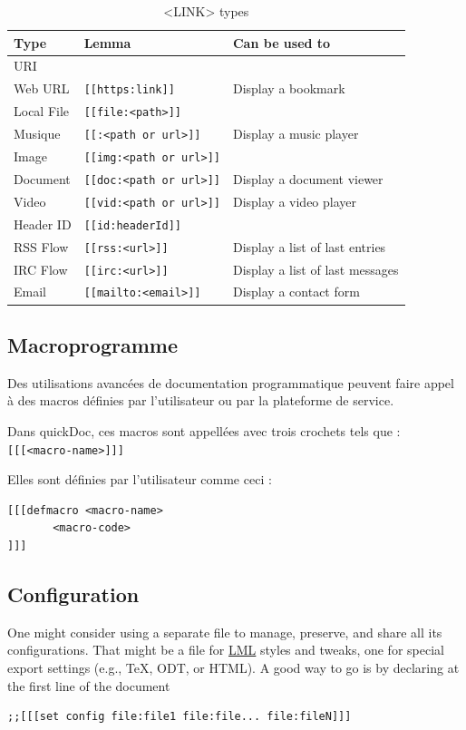 \documentclass[a4paper,12pt]{article}
\begin{document}
\begin{table}[htbp]
\caption{<LINK> types}
\centering
\begin{tabular}{lll}
\hline
Type & Lemma & Can be used to\\
\hline
URI &  & \\
Web URL & \texttt{[[https:link]]} & Display a bookmark\\
Local File & \texttt{[[file:<path>]]} & \\
Musique & \texttt{[[:<path or url>]]} & Display a music player\\
Image & \texttt{[[img:<path or url>]]} & \\
Document & \texttt{[[doc:<path or url>]]} & Display a document viewer\\
Video & \texttt{[[vid:<path or url>]]} & Display a video player\\
Header ID & \texttt{[[id:headerId]]} & \\
RSS Flow & \texttt{[[rss:<url>]]} & Display a list of last entries\\
IRC Flow & \texttt{[[irc:<url>]]} & Display a list of last messages\\
Email & \texttt{[[mailto:<email>]]} & Display a contact form\\
\hline
\end{tabular}
\end{table}
\subsection{Macroprogramme}
\label{sec:org53a60a1}
Des utilisations avancées de documentation programmatique peuvent faire appel à des macros définies par l'utilisateur ou par la plateforme de service.

Dans quickDoc, ces macros sont appellées avec trois crochets tels que : \texttt{[[[<macro-name>]]]}

Elles sont définies par l'utilisateur comme ceci :
\begin{verbatim}
[[[defmacro <macro-name>
       <macro-code>
]]]
\end{verbatim}
\subsection{Configuration}
\label{sec:org5f7e3ea}
One might consider using a separate file to manage, preserve, and share all its configurations.
That might be a file for \protect\hyperlink{gls-1}{\label{gls-1-use-5}LML} styles and tweaks, one for special export settings (e.g., \TeX{}, ODT, or HTML).
A good way to go is by declaring at the first line of the document 
\begin{verbatim}
;;[[[set config file:file1 file:file... file:fileN]]]
\end{verbatim}
\end{document}
